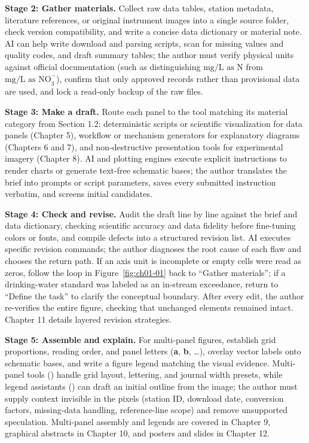 \textbf{Stage 2: Gather materials.} Collect raw data tables, station metadata, literature references, or original instrument images into a single source folder, check version compatibility, and write a concise data dictionary or material note. AI can help write download and parsing scripts, scan for missing values and quality codes, and draft summary tables; the author must verify physical units against official documentation (such as distinguishing $\text{mg/L as N}$ from $\text{mg/L as NO}_3^-$), confirm that only approved records rather than provisional data are used, and lock a read-only backup of the raw files.

\textbf{Stage 3: Make a draft.} Route each panel to the tool matching its material category from Section 1.2: deterministic scripts or scientific visualization for data panels (Chapter 5), workflow or mechanism generators for explanatory diagrams (Chapters 6 and 7), and non-destructive presentation tools for experimental imagery (Chapter 8). AI and plotting engines execute explicit instructions to render charts or generate text-free schematic bases; the author translates the brief into prompts or script parameters, saves every submitted instruction verbatim, and screens initial candidates.

\textbf{Stage 4: Check and revise.} Audit the draft line by line against the brief and data dictionary, checking scientific accuracy and data fidelity before fine-tuning colors or fonts, and compile defects into a structured revision list. AI executes specific revision commands; the author diagnoses the root cause of each flaw and chooses the return path. If an axis unit is incomplete or empty cells were read as zeros, follow the loop in Figure~\ref{fig:ch01-01} back to ``Gather materials''; if a drinking-water standard was labeled as an in-stream exceedance, return to ``Define the task'' to clarify the conceptual boundary. After every edit, the author re-verifies the entire figure, checking that unchanged elements remained intact. Chapter 11 details layered revision strategies.

\textbf{Stage 5: Assemble and explain.} For multi-panel figures, establish grid proportions, reading order, and panel letters (\textbf{a}, \textbf{b}, \dots), overlay vector labels onto schematic bases, and write a figure legend matching the visual evidence. Multi-panel tools () handle grid layout, lettering, and journal width presets, while legend assistants () can draft an initial outline from the image; the author must supply context invisible in the pixels (station ID, download date, conversion factors, missing-data handling, reference-line scope) and remove unsupported speculation. Multi-panel assembly and legends are covered in Chapter 9, graphical abstracts in Chapter 10, and posters and slides in Chapter 12.

